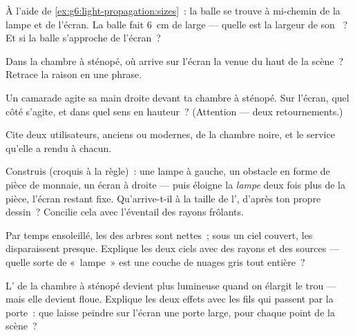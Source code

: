 \begin{exercise}[$\star$]\label{exo:g6:light-propagation:5}
À l'aide de \cref{ex:g6:light-propagation:sizes}~: la balle se trouve
à mi-chemin de la lampe et de l'écran. La balle fait \qty{6}{cm} de
large --- quelle est la largeur de son ~? Et si la balle
s'approche de l'écran~?
\end{exercise}

\begin{exercise}[$\star$]\label{exo:g6:light-propagation:6}
Dans la chambre à sténopé, où arrive sur l'écran la  venue du
haut de la scène~? Retrace la raison en une phrase.
\end{exercise}

\begin{exercise}[$\star$]\label{exo:g6:light-propagation:7}
Un camarade agite sa main droite devant ta chambre à sténopé. Sur
l'écran, quel côté s'agite, et dans quel sens en hauteur~?
(Attention --- deux retournements.)
\end{exercise}

\begin{exercise}[$\star$]\label{exo:g6:light-propagation:8}
Cite deux utilisateurs, anciens ou modernes, de la chambre noire, et
le service qu'elle a rendu à chacun.
\end{exercise}

\begin{exercise}[$\star\star$]\label{exo:g6:light-propagation:9}
Construis (croquis à la règle)~: une lampe à gauche, un obstacle en
forme de pièce de monnaie, un écran à droite --- puis éloigne la
\emph{lampe} deux fois plus de la pièce, l'écran restant fixe.
Qu'arrive-t-il à la taille de l', d'après ton propre dessin~?
Concilie cela avec l'éventail des rayons frôlants.
\end{exercise}

\begin{exercise}[$\star\star$]\label{exo:g6:light-propagation:10}
Par temps ensoleillé, les  des arbres sont nettes~; sous un
ciel couvert, les  disparaissent presque. Explique les deux
ciels avec des rayons et des sources --- quelle sorte de «~lampe~»
est une couche de nuages gris tout entière~?
\end{exercise}

\begin{exercise}[$\star\star$]\label{exo:g6:light-propagation:11}
L' de la chambre à sténopé devient plus lumineuse quand on
élargit le trou --- mais elle devient floue. Explique les deux
effets avec les fils qui passent par la porte~: que laisse peindre
sur l'écran une porte large, pour chaque point de la scène~?
\end{exercise}

